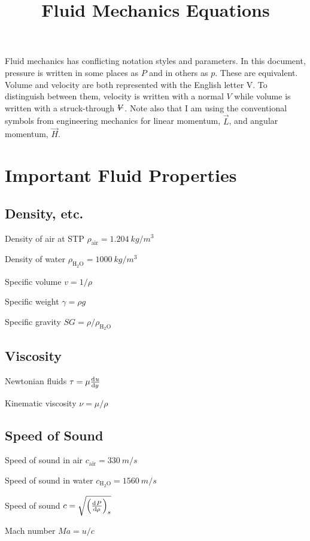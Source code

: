 \documentclass{article}
\title{Fluid Mechanics Equations}
\begin{document}
\maketitle
\tableofcontents

\newpage

\noindent Fluid mechanics has conflicting notation styles and parameters. In this document, pressure
is written in some places as $P$ and in others as $p$. These are equivalent. Volume and velocity are
both represented with the English letter V. To distinguish between them, velocity is written with a
normal $V$ while volume is written with a struck-through $\volsym$. Note also that I am using the
conventional symbols from engineering mechanics for linear momentum, $\vec{L}$, and angular
momentum, $\vec{H}$.

\section{Important Fluid Properties}

\subsection{Density, etc.}
\begin{description*}
\item[Density of air at STP]
  \(\rho_\mathrm{air} = \SI{1.204}{kg/m^3}\)
\item[Density of water]
  \(\rho_\mathrm{H_2O} = \SI{1000}{kg/m^3}\)
\item[Specific volume]
  \(v = 1/\rho\)
\item[Specific weight]
  \(\gamma = \rho g\)
\item[Specific gravity]
  \(\mathit{SG} = \rho / \rho_\mathrm{H_2O}\)
\end{description*}

\subsection{Viscosity}
\begin{description*}
\item[Newtonian fluids]
  \(\tau = \mu \od{u}{y}\)
\item[Kinematic viscosity]
  \(\nu = \mu / \rho\)
\end{description*}

\subsection{Speed of Sound}
\begin{description*}
\item[Speed of sound in air]
  \(c_\mathrm{air} = \SI{330}{m/s}\)
\item[Speed of sound in water]
  \(c_\mathrm{H_2O} = \SI{1560}{m/s}\)
\item[Speed of sound]
  \(c = \sqrt{\left(\od{P}{\rho}\right)_s}\)
\item[Mach number]
  \(\mathit{Ma} = u/c\)
\end{description*}
\end{document}
